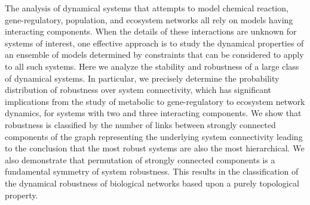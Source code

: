 The analysis of dynamical systems that attempts to model chemical reaction, gene-regulatory, population, and ecosystem networks all rely on models having interacting components. When the details of these interactions are unknown for systems of interest, one effective approach is to study the dynamical properties of an ensemble of models determined by constraints that can be considered to apply to all such systems. Here we analyze the stability and robustness of a large class of dynamical systems. In particular, we precisely determine the probability distribution of robustness over system connectivity, which has significant implications from the study of metabolic to gene-regulatory to ecosystem network dynamics, for systems with two and three interacting components. We show that robustness is classified by the number of links between strongly connected components of the graph representing the underlying system connectivity leading to the conclusion that the most robust systems are also the most hierarchical. We also demonstrate that permutation of strongly connected components is a fundamental symmetry of system robustness. This results in the classification of the dynamical robustness of biological networks based upon a purely topological property.
